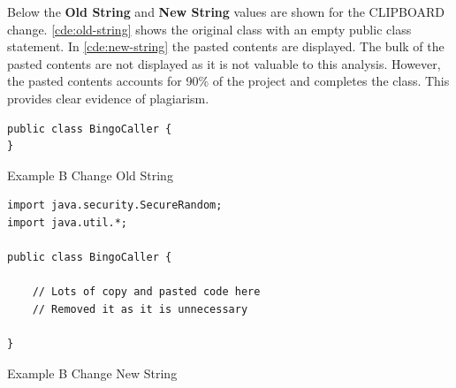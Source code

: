 Below the \textbf{Old String} and \textbf{New String} values are shown for the CLIPBOARD change. \autoref{cde:old-string} shows the original class with an empty public class statement. In \autoref{cde:new-string} the pasted contents are displayed. The bulk of the pasted contents are not displayed as it is not valuable to this analysis. However, the pasted contents accounts for 90\% of the project and completes the class. This provides clear evidence of plagiarism.

\begin{code}
\begin{verbatim}
public class BingoCaller {
}
\end{verbatim}
\caption[Submission Results B Old String]{Example B Change Old String}
\label{cde:old-string}
\end{code}

\begin{code}
\begin{verbatim}
import java.security.SecureRandom;
import java.util.*;

public class BingoCaller {

    // Lots of copy and pasted code here
    // Removed it as it is unnecessary
    
}
\end{verbatim}
\caption[Submission Results B New String]{Example B Change New String}
\label{cde:new-string}
\end{code}
